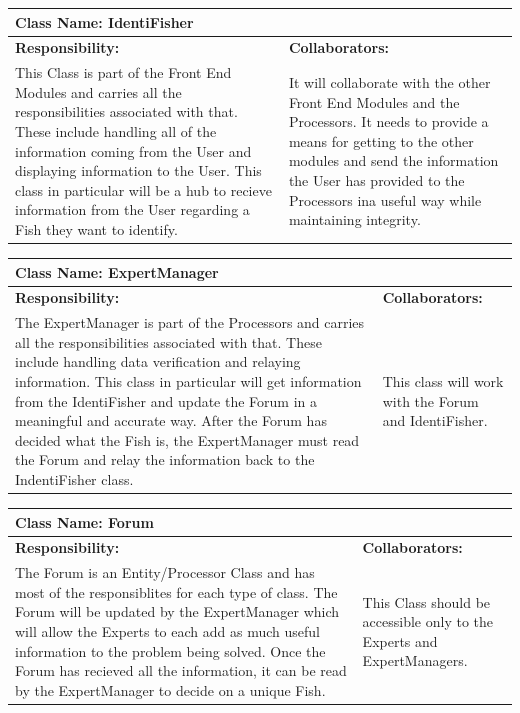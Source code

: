 \documentclass[]{article}
\begin{document}
	\begin{table}[ht]
		\centering
		\begin{tabular}{|p{5cm}|p{5cm}|}
		\hline
		 \multicolumn{2}{|l|}{\textbf{Class Name: IdentiFisher}} \\
		\hline
		\textbf{Responsibility:} & \textbf{Collaborators:} \\ \hline
		This Class is part of the Front End Modules and carries all the responsibilities associated with that. These include handling all of the information coming from the User and displaying information to the User. This class in particular will be a hub to recieve information from the User regarding a Fish they want to identify. & It will collaborate with the other Front End Modules and the Processors. It needs to provide a means for getting to the other modules and send the information the User has provided to the Processors ina useful way while maintaining integrity. \\
		\hline
		\end{tabular}
	\end{table}

	\begin{table}[ht]
		\centering
		\begin{tabular}{|p{5cm}|p{5cm}|}
		\hline
		 \multicolumn{2}{|l|}{\textbf{Class Name: ExpertManager}} \\
		\hline
		\textbf{Responsibility:} & \textbf{Collaborators:} \\ \hline
		The ExpertManager is part of the Processors and carries all the responsibilities associated with that. These include handling data verification and relaying information. This class in particular will get information from the IdentiFisher and update the Forum in a meaningful and accurate way. After the Forum has decided what the Fish is, the ExpertManager must read the Forum and relay the information back to the IndentiFisher class. & This class will work with the Forum and IdentiFisher.\\
		\hline
		\end{tabular}
	\end{table}

	\begin{table}[ht]
		\centering
		\begin{tabular}{|p{5cm}|p{5cm}|}
		\hline
		 \multicolumn{2}{|l|}{\textbf{Class Name: Forum}} \\
		\hline
		\textbf{Responsibility:} & \textbf{Collaborators:} \\ \hline
		The Forum is an Entity/Processor Class and has most of the responsiblites for each type of class. The Forum will be updated by the ExpertManager which will allow the Experts to each add as much useful information to the problem being solved. Once the Forum has recieved all the information, it can be read by the ExpertManager to decide on a unique Fish. & This Class should be accessible only to the Experts and ExpertManagers. \\
		\hline
		\end{tabular}
	\end{table}
\end{document}
